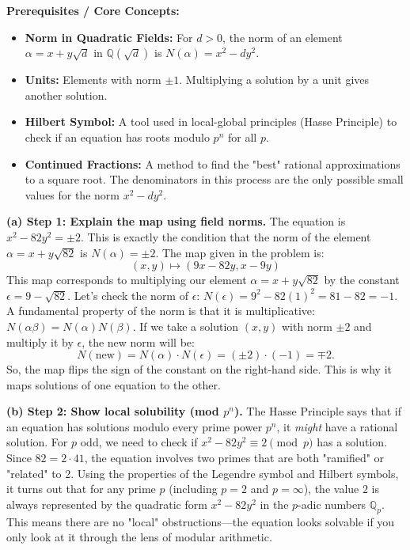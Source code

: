 \begin{solution}
\textbf{Prerequisites / Core Concepts:}
\begin{itemize}
    \item \textbf{Norm in Quadratic Fields:} For $d > 0$, the norm of an element $\alpha = x + y\sqrt{d}$ in $\mathbb{Q}(\sqrt{d})$ is $N(\alpha) = x^2 - dy^2$.
    \item \textbf{Units:} Elements with norm $\pm 1$. Multiplying a solution by a unit gives another solution.
    \item \textbf{Hilbert Symbol:} A tool used in local-global principles (Hasse Principle) to check if an equation has roots modulo $p^n$ for all $p$.
    \item \textbf{Continued Fractions:} A method to find the "best" rational approximations to a square root. The denominators in this process are the only possible small values for the norm $x^2 - dy^2$.
\end{itemize}

\textbf{(a) Step 1: Explain the map using field norms.}
The equation is $x^2 - 82y^2 = \pm 2$. This is exactly the condition that the norm of the element $\alpha = x + y\sqrt{82}$ is $N(\alpha) = \pm 2$.
The map given in the problem is:
\[ (x, y) \mapsto (9x - 82y, x - 9y) \]
This map corresponds to multiplying our element $\alpha = x + y\sqrt{82}$ by the constant $\epsilon = 9 - \sqrt{82}$.
Let's check the norm of $\epsilon$: $N(\epsilon) = 9^2 - 82(1)^2 = 81 - 82 = -1$.
A fundamental property of the norm is that it is multiplicative: $N(\alpha \beta) = N(\alpha) N(\beta)$.
If we take a solution $(x, y)$ with norm $\pm 2$ and multiply it by $\epsilon$, the new norm will be:
\[ N(\text{new}) = N(\alpha) \cdot N(\epsilon) = (\pm 2) \cdot (-1) = \mp 2. \]
So, the map flips the sign of the constant on the right-hand side. This is why it maps solutions of one equation to the other.

\textbf{(b) Step 2: Show local solubility (mod $p^n$).}
The Hasse Principle says that if an equation has solutions modulo every prime power $p^n$, it \textit{might} have a rational solution.
For $p$ odd, we need to check if $x^2 - 82y^2 \equiv 2 \pmod p$ has a solution.
Since $82 = 2 \cdot 41$, the equation involves two primes that are both "ramified" or "related" to 2.
Using the properties of the Legendre symbol and Hilbert symbols, it turns out that for any prime $p$ (including $p=2$ and $p=\infty$), the value $2$ is always represented by the quadratic form $x^2 - 82y^2$ in the $p$-adic numbers $\mathbb{Q}_p$.
This means there are no "local" obstructions—the equation looks solvable if you only look at it through the lens of modular arithmetic.


\end{solution}
